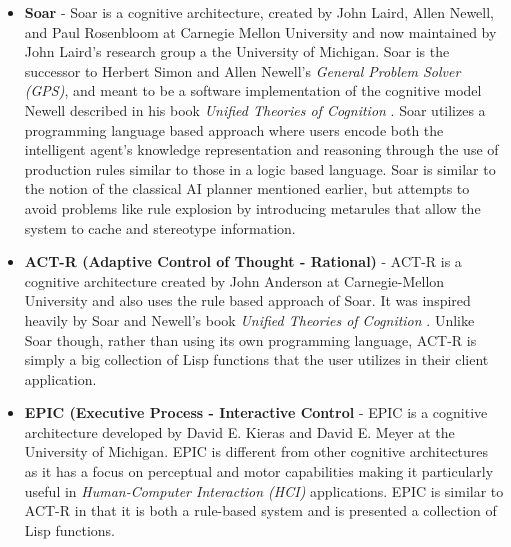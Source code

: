 \begin{itemize}
\item \textbf{Soar} - Soar is a cognitive architecture, created by John Laird, Allen Newell, and Paul Rosenbloom at Carnegie Mellon University and now maintained by John Laird's research group a the University of Michigan. Soar is the successor to Herbert Simon and Allen Newell's \textit{General Problem Solver (GPS)}, and meant to be a software implementation of the cognitive model Newell described in his book \textit{Unified Theories of Cognition} \citep{newell:unifiedtheories}. Soar utilizes a programming language based approach where users encode both the intelligent agent's knowledge representation and reasoning through the use of production rules similar to those in a logic based language. Soar is similar to the notion of the classical AI planner mentioned earlier, but attempts to avoid problems like rule explosion by introducing metarules that allow the system to cache and stereotype information. \citep{lehman:gentlesoarintro, laird:extendingsoar, laird:soarmanual}
\item \textbf{ACT-R (Adaptive Control of Thought - Rational)} - ACT-R is a cognitive architecture created by John Anderson at Carnegie-Mellon University and also uses the rule based approach of Soar. It was inspired heavily by Soar and Newell's book \textit{Unified Theories of Cognition} \citep{newell:unifiedtheories}. Unlike Soar though, rather than using its own programming language, ACT-R is simply a big collection of Lisp functions that the user utilizes in their client application. \citep{anderson:acttheory, anderson:actr}
\item \textbf{EPIC (Executive Process - Interactive Control} - EPIC is a cognitive architecture developed by  David E. Kieras and David E. Meyer at the University of Michigan. EPIC is different from other cognitive architectures as it has a focus on perceptual and motor capabilities making it particularly useful in \textit{Human-Computer Interaction (HCI)} applications. EPIC is similar to ACT-R in that it is both a rule-based system and is presented a collection of Lisp functions.\citep{kieras:epic}
\end{itemize}

